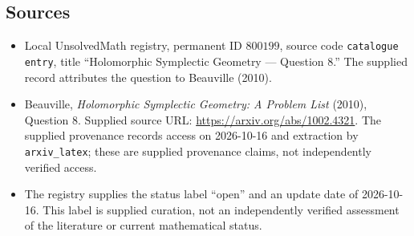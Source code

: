 \documentclass[11pt]{article}
\begin{document}
\subsection{Sources}
\begin{itemize}
\item Local UnsolvedMath registry, permanent ID \(800199\), source code \texttt{catalogue entry}, title ``Holomorphic Symplectic Geometry --- Question 8.'' The supplied record attributes the question to Beauville (2010).
\item Beauville, \emph{Holomorphic Symplectic Geometry: A Problem List} (2010), Question 8. Supplied source URL: \url{https://arxiv.org/abs/1002.4321}. The supplied provenance records access on 2026-10-16 and extraction by \texttt{arxiv\_latex}; these are supplied provenance claims, not independently verified access.
\item The registry supplies the status label ``open'' and an update date of 2026-10-16. This label is supplied curation, not an independently verified assessment of the literature or current mathematical status.
\end{itemize}
\end{document}
